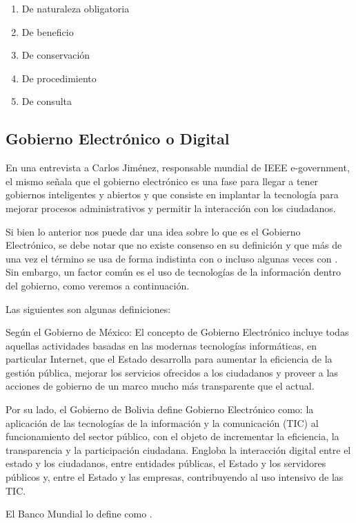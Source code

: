 \begin{enumerate}
    \item De naturaleza obligatoria
    \item De beneficio
    \item De conservación
    \item De procedimiento
    \item De consulta
\end{enumerate}

\subsection{Gobierno Electrónico o Digital}

En una entrevista a Carlos Jiménez, responsable mundial de IEEE e-government, el mismo señala que el gobierno electrónico es una fase para llegar a tener gobiernos inteligentes y abiertos y que consiste en implantar la tecnología para mejorar procesos administrativos y permitir la interacción con los ciudadanos.

Si bien lo anterior nos puede dar una idea sobre lo que es el Gobierno Electrónico, se debe notar que no existe consenso en su definición y que más de una vez el término se usa de forma indistinta con  o incluso algunas veces con . Sin embargo, un factor común es el uso de tecnologías de la información dentro del gobierno, como veremos a continuación.

Las siguientes son algunas definiciones:

Según el Gobierno de México: El concepto de Gobierno Electrónico incluye todas aquellas actividades basadas en las modernas tecnologías informáticas, en particular Internet, que el Estado desarrolla para aumentar la eficiencia de la gestión pública, mejorar los servicios ofrecidos a los ciudadanos y proveer a las acciones de gobierno de un marco mucho más transparente que el actual.

Por su lado, el Gobierno de Bolivia define Gobierno Electrónico como: la aplicación de las tecnologías de la información y la comunicación (TIC) al funcionamiento del sector público, con el objeto de incrementar la eficiencia, la transparencia y la participación ciudadana.
Engloba la interacción digital entre el estado y los ciudadanos, entre entidades públicas, el Estado y los servidores públicos y, entre el Estado y las empresas, contribuyendo al uso intensivo de las TIC.

El Banco Mundial lo define como .

